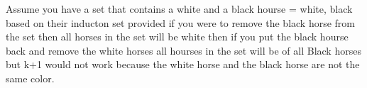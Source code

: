 Assume you have a set that contains a white and a black hourse = {white, black}
based on their inducton set provided if you were to remove the black horse from the set then all horses in the set will be white
then if you put the black hourse back and remove the white horses all hourses in the set will be of all Black horses
but k+1 would not work because the white horse and the black horse are not the same color.